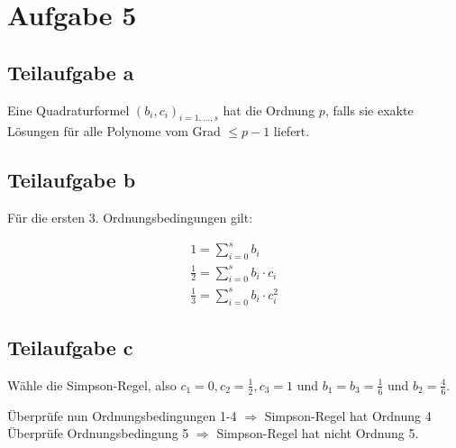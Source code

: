 \section*{Aufgabe 5}
\subsection*{Teilaufgabe a}
Eine Quadraturformel $(b_i, c_i)_{i=1, \dots, s}$ hat die Ordnung
$p$, falls sie exakte Lösungen für alle Polynome vom Grad $\leq p -1$
liefert.

\subsection*{Teilaufgabe b}
Für die ersten 3. Ordnungsbedingungen gilt:

\begin{align*}
	1 = \sum_{i = 0}^{s} b_i \\
 	\frac{1}{2} = \sum_{i = 0}^{s} b_i \cdot c_i \\
 	\frac{1}{3} = \sum_{i = 0}^{s} b_i \cdot c_i^2
\end{align*}

\subsection*{Teilaufgabe c}
Wähle die Simpson-Regel, also $c_1=0, c_2 = \frac{1}{2}, c_3 = 1$ und
$b_1 = b_3 = \frac{1}{6}$ und $b_2 = \frac{4}{6}$.

Überprüfe nun Ordnungsbedingungen 1-4 $\Rightarrow$ Simpson-Regel hat Ordnung 4
Überprüfe Ordnungsbedingung 5 $\Rightarrow$ Simpson-Regel hat nicht Ordnung 5. %
